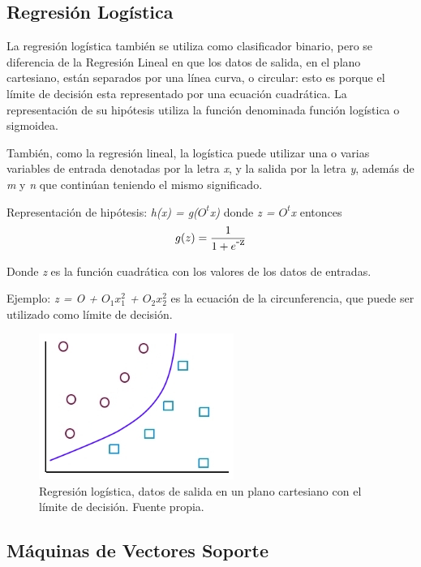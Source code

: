 \documentclass[a4paper,12pt,oneside,spanish]{book}
\begin{document}
\subsection{Regresión Logística}

La regresión logística también se utiliza como clasificador binario, pero se diferencia de la Regresión Lineal en que los datos de salida, en el plano cartesiano, están separados por una línea curva, o circular: esto es porque el límite de decisión esta representado por una ecuación cuadrática. La representación de su hipótesis utiliza la función denominada función logística o sigmoidea. \par

También, como la regresión lineal, la logística puede utilizar una o varias variables de entrada denotadas por la letra \textit{x}, y la salida por la letra \textit{y}, además de \textit{m} y \textit{n} que continúan teniendo el mismo significado. \par

Representación de hipótesis: \textit{h(x) = g($O^t$x)}
donde \textit{z = $O^t$x}
entonces 
\begin{equation}
	g(z) = \frac{1}{1 + e\raisebox{1ex}{-z}} 
\end{equation}

Donde \textit{z} es la función cuadrática con los valores de los datos de entradas. \par

Ejemplo: \textit{z = O + $O_1$$x^2_1$ + $O_2$$x^2_2$}  es la ecuación de la circunferencia, que puede ser utilizado como límite de decisión.

\begin{figure}[h!]
	\includegraphics[width=180pt]{Imagenes/regresion2.jpg}
	\centering
	\caption{Regresión logística, datos de salida en un plano cartesiano con el límite de decisión. Fuente propia.}
	\label{fig:regresion2}
\end{figure}

\subsection{Máquinas de Vectores Soporte}
\end{document}
